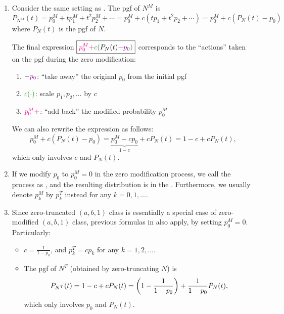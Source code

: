 \begin{enumerate}
\item \label{it:zm-pgf-fmlas}
Consider the same setting as . The pgf of \(N^M\)
is
 \[
P_{N^M}(t)=p_0^M+tp_1^M+t^2p_2^M+\dotsb
=p_0^M+c(tp_1+t^2p_2+\dotsb)
=\boxed{p_0^M+c(P_N(t)-p_0)}
\]
where \(P_N(t)\) is the pgf of \(N\).

\begin{intuition}
The final expression \(\boxed{\mgc{p_0^M+}\gc{c(}P_N(t)\vc{-p_0}\gc{)}}\) corresponds to the
``actions'' taken on the pgf during the zero modification:
\begin{enumerate}[label={(\arabic*)}]
\item \({\color{violet}-p_0}\): ``take away'' the original \(p_0\) from the initial pgf
\item \(\gc{c(\cdot)}\): scale \(p_1,p_2,\dotsc\) by \(c\)
\item \({\color{magenta}p_0^M+}\): ``add back'' the modified probability \(p_0^M\)
\end{enumerate}
\end{intuition}

We can also rewrite the expression as follows:
\[
p_0^M+c(P_N(t)-p_0)
=\underbrace{p_0^M-cp_0}_{1-c}+cP_N(t)
=\boxed{1-c+cP_N(t)},
\]
which only involves \(c\) and \(P_N(t)\).

\item If we modify \(p_0\) to \(p_0^M=0\) in the zero modification process, we
call the process as , and the resulting distribution is
in the . Furthermore, we usually denote
\(p_k^M\) by \(p_k^T\) instead for any \(k=0,1,\dotsc\).

\item \label{it:zt-fmlas}
Since zero-truncated \((a,b,1)\) class is essentially a special case of
zero-modified \((a,b,1)\) class, previous formulas in
 also apply, by
setting \(p_0^M=0\). Particularly:
\begin{itemize}
\item \(\displaystyle c=\frac{1}{1-p_0}\), and \(p_k^T=cp_k\) for any \(k=1,2,\dotsc\).
\item The pgf of \(N^T\) (obtained by zero-truncating \(N\)) is
\[
P_{N^T}(t)=1-c+cP_N(t)=\qty(1-\frac{1}{1-p_0})+\frac{1}{1-p_0}P_N(t),
\]
which only involves \(p_0\) and \(P_N(t)\).
\end{itemize}
\end{enumerate}
